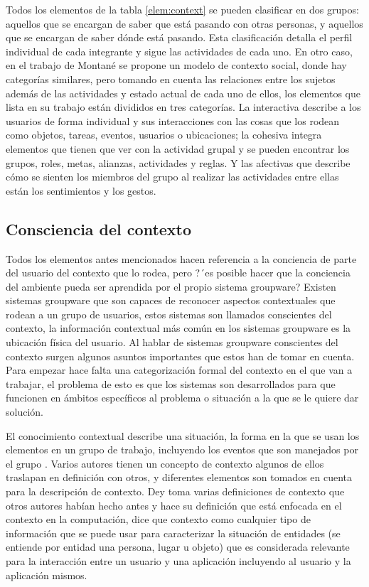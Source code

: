 Todos los elementos de la tabla \ref*{elem:context} se pueden clasificar en dos grupos: aquellos que se encargan de saber que est\'a pasando con otras personas, y aquellos que se encargan de saber d\'onde est\'a pasando. Esta clasificaci\'on detalla el perfil individual de cada integrante y sigue las actividades de cada uno. En otro caso, en el trabajo de Montan\'e \cite{montane2013context} se propone un modelo de contexto social, donde hay categor\'ias similares, pero tomando en cuenta las relaciones entre los sujetos adem\'as de las actividades y estado actual de cada uno de ellos, los elementos que lista en su trabajo est\'an divididos en tres categor\'ias. La interactiva describe a los usuarios de forma individual y sus interacciones con las cosas que los rodean como objetos, tareas, eventos, usuarios o ubicaciones; la cohesiva integra elementos que tienen que ver con la actividad grupal y se pueden encontrar los grupos, roles, metas, alianzas, actividades y reglas. Y las afectivas que describe c\'omo se sienten los miembros del grupo al realizar las actividades entre ellas est\'an los sentimientos y los gestos.

\subsection{Consciencia del contexto}
Todos los elementos antes mencionados hacen referencia a la conciencia de parte del usuario del contexto que lo rodea, pero ?´es posible hacer que la conciencia del ambiente pueda ser aprendida por el propio sistema groupware? Existen sistemas groupware que son capaces de reconocer aspectos contextuales que rodean a un grupo de usuarios, estos sistemas son llamados conscientes del contexto, la informaci\'on contextual m\'as com\'un en los sistemas groupware es la ubicaci\'on f\'isica del usuario. Al hablar de sistemas groupware conscientes del contexto surgen algunos asuntos importantes que estos han de tomar en cuenta. Para empezar hace falta una categorizaci\'on formal del contexto en el que van a trabajar, el problema de esto es que los sistemas son desarrollados para que funcionen en \'ambitos espec\'ificos al problema o situaci\'on a la que se le quiere dar soluci\'on.

El conocimiento contextual describe una situaci\'on, la forma en la que se usan los elementos en un grupo de trabajo, incluyendo los eventos que son manejados por el grupo \cite{brezillon2004context}. Varios autores tienen un concepto de contexto algunos de ellos traslapan en definici\'on con otros, y diferentes elementos son tomados en cuenta para la descripci\'on de contexto. Dey \cite{dey2001conceptual} toma varias definiciones de contexto que otros autores hab\'ian hecho antes y hace su definici\'on que est\'a enfocada en el contexto en la computaci\'on, dice que contexto como cualquier tipo de informaci\'on que se puede usar para caracterizar la situaci\'on de entidades (se entiende por entidad una persona, lugar u objeto) que es considerada relevante para la interacci\'on entre un usuario y una aplicaci\'on incluyendo al usuario y la aplicaci\'on mismos.

